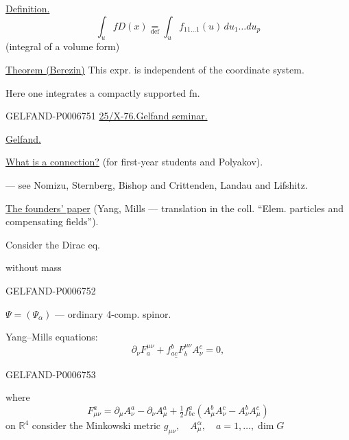 \underline{Definition.}
\[
\int_u fD(x)\underset{\mathrm{def}}{=}
\int_u f_{11\ldots1}(u)\,du_1\ldots du_p
\]
(integral of a volume form)

\underline{Theorem (Berezin)} This expr. is independent of the coordinate system.

Here one integrates a compactly supported fn.


\begin{GelfandAdjacentEvidence}{GELFAND-P000675}{1}
\underline{25/X-76.}\qquad \underline{Gelfand seminar.}

\underline{Gelfand.}

\underline{What is a connection?} (for first-year students and Polyakov).

--- see Nomizu, Sternberg, Bishop and Crittenden, Landau and Lifshitz.


\underline{The founders’ paper} (Yang, Mills --- translation in the coll. “Elem. particles and compensating fields”).

Consider the Dirac eq.

{\small without mass}
\end{GelfandAdjacentEvidence}
\begin{GelfandAdjacentEvidence}{GELFAND-P000675}{2}

\(\Psi=(\Psi_\alpha)\) --- ordinary 4-comp. spinor.

Yang–Mills equations:
\[
\underline{\partial_\nu F_a^{\mu\nu}+f^b_{ac}F_b^{\mu\nu}A_\nu^c=0},
\]
\end{GelfandAdjacentEvidence}
\begin{GelfandAdjacentEvidence}{GELFAND-P000675}{3}

where
\[
F_{\mu\nu}^a=\partial_\mu A_\nu^a-\partial_\nu A_\mu^a
+\tfrac12 f_{bc}^a(A_\mu^b A_\nu^c-A_\nu^b A_\mu^c)
\]
on \(\mathbb R^4\) consider the Minkowski metric \(g_{\mu\nu},\quad A_\mu^\alpha,\quad a=1,\ldots,\dim G\)
\end{GelfandAdjacentEvidence}
